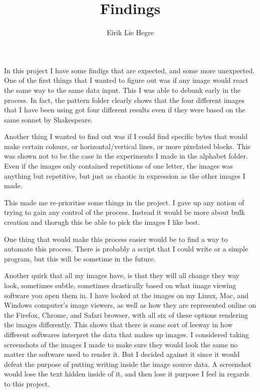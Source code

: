 \documentclass[12pt, letterpaper]{article}
\title{Findings}
\author{Eirik Lie Hegre}
\begin{document}
\maketitle

In this project I have some findigs that are expected, and some more unexpected.
One of the first things that I wanted to figure out was if any image would react
the same way to the same data input. This I was able to debunk early in the
process. In fact, the pattern folder clearly shows that the four different
images that I have been using got four different results even if they were based
on the same sonnet by Shakespeare. \par
Another thing I wanted to find out was if I could find specific bytes that would
make certain colours, or horizontal/vertical lines, or more pixelated blocks.
This was shown not to be the case in the experiments I made in the alphabet
folder. Even if the images only contained repetitions of one letter, the images
was anything but repetitive, but just as chaotic in expression as the other
images I made. \par
This made me re-prioritise some things in the project. I gave up any notion of
trying to gain any control of the process. Instead it would be more about bulk
creation and thorugh this be able to pick the images I like best. \par
One thing that would make this process easier would be to find a way to automate
this process. There is probably a script that I could write or a simple program,
but this will be sometime in the future. \par
Another quirk that all my images have, is that they will all change they way
look, sometimes subtle, sometimes drastically based on what image viewing
software you open them in. I have looked at the images on my Linux, Mac, and
Windows computer's image viewers, as well as how they are represented online on
the Firefox, Chrome, and Safari browser, with all six of these options
rendering the images differently. This shows that there is some sort of leeway
in how different softwares interpret the data that makes up images. I considered
taking screenshots of the images I made to make sure they would look the same no
matter the software used to render it. But I decided against it since it would
defeat the purpose of putting writing inside the image source data. A screenshot
would lose the text hidden inside of it, and then lose it purpose I feel in
regards to this project.
\end{document}
